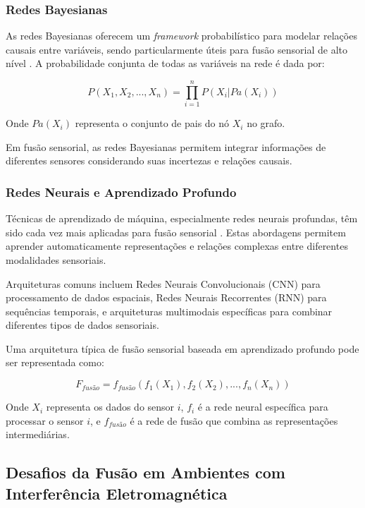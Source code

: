 \subsubsection{Redes Bayesianas}

As redes Bayesianas oferecem um \textit{framework} probabilístico para modelar relações causais entre variáveis, sendo particularmente úteis para fusão sensorial de alto nível \cite{Ramos2012AplicacaoTecnicas}. A probabilidade conjunta de todas as variáveis na rede é dada por:

\begin{equation}
P(X_1, X_2, ..., X_n) = \prod_{i=1}^{n} P(X_i | Pa(X_i))
\end{equation}

Onde $Pa(X_i)$ representa o conjunto de pais do nó $X_i$ no grafo.

Em fusão sensorial, as redes Bayesianas permitem integrar informações de diferentes sensores considerando suas incertezas e relações causais.

\subsubsection{Redes Neurais e Aprendizado Profundo}

Técnicas de aprendizado de máquina, especialmente redes neurais profundas, têm sido cada vez mais aplicadas para fusão sensorial \cite{Kim2023MultimodalFusion}. Estas abordagens permitem aprender automaticamente representações e relações complexas entre diferentes modalidades sensoriais.

Arquiteturas comuns incluem Redes Neurais Convolucionais (\ac{CNN}) para processamento de dados espaciais, Redes Neurais Recorrentes (\ac{RNN}) para sequências temporais, e arquiteturas multimodais específicas para combinar diferentes tipos de dados sensoriais.

Uma arquitetura típica de fusão sensorial baseada em aprendizado profundo pode ser representada como:

\begin{equation}
F_{fusão} = f_{fusão}(f_1(X_1), f_2(X_2), ..., f_n(X_n))
\end{equation}

Onde $X_i$ representa os dados do sensor $i$, $f_i$ é a rede neural específica para processar o sensor $i$, e $f_{fusão}$ é a rede de fusão que combina as representações intermediárias.

\subsection{Desafios da Fusão em Ambientes com Interferência Eletromagnética}

